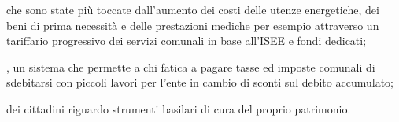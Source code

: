  che sono state più toccate  dall'aumento dei costi delle utenze energetiche, dei beni di prima necessità e delle prestazioni mediche per esempio attraverso un tariffario progressivo dei servizi comunali in base all'ISEE e fondi dedicati;

, un sistema che permette a chi fatica a pagare tasse ed imposte comunali di sdebitarsi con piccoli lavori per l'ente in cambio di sconti sul debito accumulato; 

 dei cittadini riguardo strumenti basilari di cura del proprio patrimonio. 
